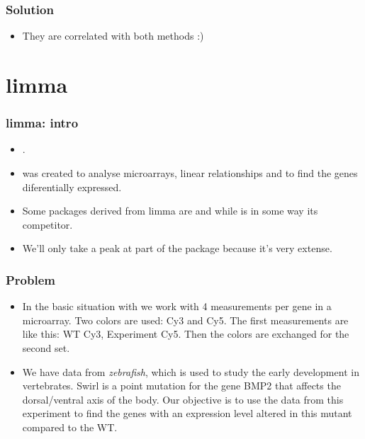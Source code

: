 \begin{frame}
  \frametitle{Solution}
  \begin{itemize}
\begin{Schunk}
\begin{Sinput}
> cor(kid.weights$height, kid.weights$weight)
\end{Sinput}
\begin{Soutput}
[1] 0.8237564
\end{Soutput}
\begin{Sinput}
> cor(kid.weights$height, kid.weights$weight, 
+     method = "s")
\end{Sinput}
\begin{Soutput}
[1] 0.8822136
\end{Soutput}
\end{Schunk}
  \item They are correlated with both methods :)
  \end{itemize}
\end{frame}

\section{limma}

\begin{frame}[allowframebreaks]
  \frametitle{limma: intro}
  \begin{itemize}
  \item{}.
  \item {} was created to analyse microarrays, linear relationships and to find the genes diferentially expressed.
  \item Some packages derived from limma are  and  while  is in some way its competitor.
  \item We'll only take a peak at part of the package because it's very extense.
  \end{itemize}
\end{frame}

\begin{frame}[allowframebreaks]
  \frametitle{Problem}
  \begin{itemize}
  \item In the basic situation with  we work with 4 measurements per gene in a microarray. Two colors are used: Cy3 and Cy5. The first measurements are like this: WT Cy3, Experiment Cy5. Then the colors are exchanged for the second set.
  \item We have data from \emph{zebrafish}, which is used to study the early development in vertebrates. Swirl is a point mutation for the gene BMP2 that affects the dorsal/ventral axis of the body. Our objective is to use the data from this experiment to find the genes with an expression level altered in this mutant compared to the WT.
  \end{itemize}
\end{frame}

